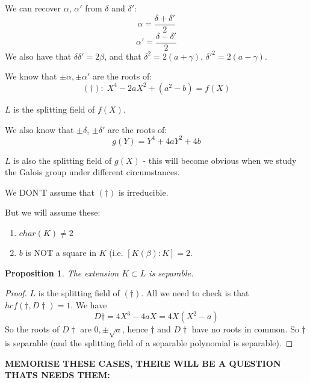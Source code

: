 \documentclass{article}
\theoremstyle{definition}
\theoremstyle{plain}%
\newtheorem{prop}[thm]{Proposition}
\theoremstyle{remark}
\begin{document}
We can recover $\alpha$, $\alpha'$ from $\delta$ and $\delta'$:
\[\alpha = \frac{\delta + \delta'}{2}\]
\[\alpha' = \frac{\delta - \delta'}{2}\]
We also have that $\delta\delta' = 2\beta$, and that $\delta^2 = 2(a + \gamma)$, $\delta'^2 = 2(a - \gamma)$.

We know that $\pm\alpha, \pm \alpha'$ are the roots of:
\[(\dagger): \; X^4 - 2aX^2 + (a^2-b) = f(X)\]

$L$ is the splitting field of $f(X)$.

We also know that $\pm \delta$, $\pm \delta'$ are the roots of:
\[g(Y) = Y^4 + 4aY^2 + 4b\]

$L$ is also the splitting field of $g(X)$ - this will become obvious when we study the Galois group under different circumstances.

We DON'T assume that $(\dagger)$ is irreducible.

But we will assume these:
\begin{enumerate}
    \item $char(K) \ne 2$
    \item $b$ is NOT a square in $K$ (i.e. $[K(\beta) : K] = 2$.
\end{enumerate}



\begin{prop}
    The extension $K \subset L$ is separable.
\end{prop}

\begin{proof}
    $L$ is the splitting field of $(\dagger)$. All we need to check is that $hcf(\dagger, D\dagger) = 1$. We have
    \[D\dagger = 4X^3 - 4aX = 4X(X^2 - a)\]
    So the roots of $D\dagger$ are $0, \pm \sqrt{a}$, hence $\dagger$ and $D\dagger$ have no roots in common. So $\dagger$ is separable (and the splitting field of a separable polynomial is separable).
\end{proof}

\textbf{MEMORISE THESE CASES, THERE WILL BE A QUESTION THATS NEEDS THEM:}
\end{document}
